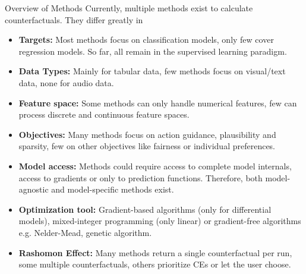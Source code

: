 \documentclass[11pt,compress,t,notes=noshow, xcolor=table]{beamer}
\begin{document}
\begin{vbframe}{Overview of Methods}
	Currently, multiple methods exist to calculate counterfactuals. They differ greatly in 
	\begin{itemize}
		\item \textbf{Targets:} Most methods focus on classification models, only few cover regression models. So far, all remain in the supervised learning paradigm.
		\item \textbf{Data Types:} Mainly for tabular data, few methods focus on visual/text data, none for audio data.
		\item \textbf{Feature space:} Some methods can only handle numerical features, few can process discrete and continuous feature spaces. 
		\item \textbf{Objectives:} Many methods focus on action guidance, plausibility and sparsity, few on other objectives like fairness or individual preferences.
		\framebreak
		\item \textbf{Model access:} Methods could require access to complete model internals, access to gradients or only to prediction functions. Therefore, both model-agnostic and model-specific methods exist.
		\item \textbf{Optimization tool:} Gradient-based algorithms (only for differential models), mixed-integer programming (only linear) or gradient-free algorithms e.g. Nelder-Mead, genetic algorithm. 
		\item \textbf{Rashomon Effect:} Many methods return a single counterfactual per run, some multiple counterfactuals, others prioritize CEs or let the user choose.
	\end{itemize}
\end{vbframe}
\end{document}
